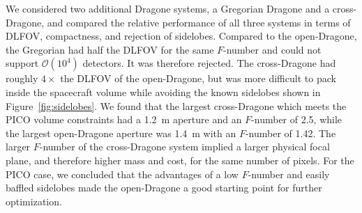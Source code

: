 \documentclass[]{spie}  %
\newcommand{\comr}[1]{\textcolor{red}{#1}}
\newcommand{\como}[1]{\textcolor{orange}{#1}}
\begin{document}
We considered two additional Dragone systems, a Gregorian Dragone and a cross-Dragone, and compared the 
relative performance of all three systems in terms of DLFOV, compactness, and rejection of sidelobes.  
Compared to the open-Dragone, the Gregorian had half the DLFOV for the same $F$-number and could not  
support $\mathcal{O}(10^4)$ detectors. It was therefore rejected.  
The cross-Dragone had roughly $4\times$ the DLFOV of the open-Dragone, 
but was more difficult to pack inside the spacecraft volume while avoiding the known sidelobes shown in Figure~\ref{fig:sidelobes}.
We found that the largest cross-Dragone which meets the PICO volume constraints had 
a 1.2~m aperture and an $F$-number of 2.5, while the largest open-Dragone aperture was 1.4~m with an $F$-number of 1.42. The larger 
$F$-number of the cross-Dragone system implied a larger physical focal plane, and therefore higher mass and cost, 
for the same number of pixels. 
For the PICO case, we concluded that the advantages of a low $F$-number and easily baffled sidelobes made the open-Dragone a good starting  
point for further optimization. 

\end{document}
